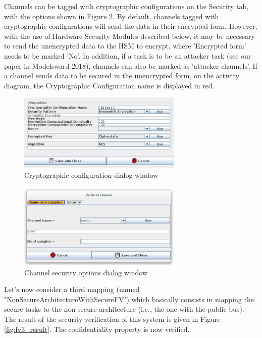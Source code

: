 \documentclass[12pt]{article}
\begin{document}
Channels can be tagged with cryptographic configurations on the Security tab, with the options shown in Figure \ref{fig:channelsec}. By default, channels tagged with cryptographic configurations will send the data in their encrypted form. However, with the use of Hardware Security Modules described below, it may be necessary to send the unencrypted data to the HSM to encrypt, where 'Encrypted form' needs to be marked 'No'. In addition, if a task is to be an attacker task (see our paper in Modelsward 2018), channels can also be marked as `attacker channels'. If a channel sends data to be secured in the unencrypted form, on the activity diagram, the Cryptographic Configuration name is displayed in red. 


\begin{figure}[htbp]
\centering
\includegraphics[width=0.7\textwidth]{fig/ccdialog.png}
\caption{Cryptographic configuration dialog window} \label{fig:ccdialog}
\end{figure}



\begin{figure}[htbp]
\centering
\includegraphics[width=0.7\textwidth]{fig/channelsecurityoptions.png}
\caption{Channel security options dialog window} \label{fig:channelsec}
\end{figure}

Let's now consider a third mapping (named "NonSecureArchitectureWithSecureFV") which basically consists in mapping the secure tasks to the non secure architecture (i.e., the one with the public bus). The result of the security verification of this system is given in Figure \ref{fig:fv3_result}. The confidentiality property is now verified.
\end{document}
